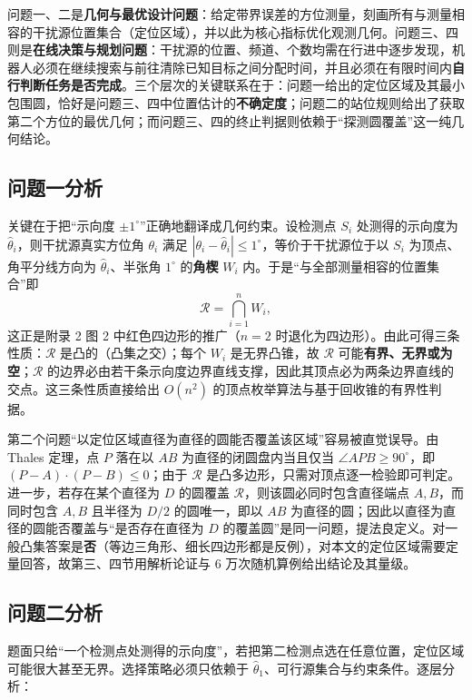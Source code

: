 \documentclass{cumcmthesis}
\begin{document}
问题一、二是\textbf{几何与最优设计问题}：给定带界误差的方位测量，刻画所有与测量相容的干扰源位置集合（定位区域），并以此为核心指标优化观测几何。问题三、四则是\textbf{在线决策与规划问题}：干扰源的位置、频道、个数均需在行进中逐步发现，机器人必须在继续搜索与前往清除已知目标之间分配时间，并且必须在有限时间内\textbf{自行判断任务是否完成}。三个层次的关键联系在于：问题一给出的定位区域及其最小包围圆，恰好是问题三、四中位置估计的\textbf{不确定度}；问题二的站位规则给出了获取第二个方位的最优几何；而问题三、四的终止判据则依赖于“探测圆覆盖”这一纯几何结论。

\subsection{问题一分析}

关键在于把“示向度 $\pm1^{\circ}$”正确地翻译成几何约束。设检测点 $S_i$ 处测得的示向度为 $\hat\theta_i$，则干扰源真实方位角 $\theta_i$ 满足 $|\theta_i-\hat\theta_i|\le 1^{\circ}$，等价于干扰源位于以 $S_i$ 为顶点、角平分线方向为 $\hat\theta_i$、半张角 $1^{\circ}$ 的\textbf{角楔} $W_i$ 内。于是“与全部测量相容的位置集合”即
\[
\mathcal{R}=\bigcap_{i=1}^{n} W_i,
\]
这正是附录 2 图 2 中红色四边形的推广（$n=2$ 时退化为四边形）。由此可得三条性质：$\mathcal{R}$ 是凸的（凸集之交）；每个 $W_i$ 是无界凸锥，故 $\mathcal{R}$ 可能\textbf{有界、无界或为空}；$\mathcal{R}$ 的边界必由若干条示向度边界直线支撑，因此其顶点必为两条边界直线的交点。这三条性质直接给出 $O(n^2)$ 的顶点枚举算法与基于回收锥的有界性判据。

第二个问题“以定位区域直径为直径的圆能否覆盖该区域”容易被直觉误导。由 Thales 定理，点 $P$ 落在以 $AB$ 为直径的闭圆盘内当且仅当 $\angle APB\ge90^{\circ}$，即 $(P-A)\cdot(P-B)\le0$；由于 $\mathcal{R}$ 是凸多边形，只需对顶点逐一检验即可判定。进一步，若存在某个直径为 $D$ 的圆覆盖 $\mathcal{R}$，则该圆必同时包含直径端点 $A,B$，而同时包含 $A,B$ 且半径为 $D/2$ 的圆唯一，即以 $AB$ 为直径的圆；因此以直径为直径的圆能否覆盖与“是否存在直径为 $D$ 的覆盖圆”是同一问题，提法良定义。对一般凸集答案是\textbf{否}（等边三角形、细长四边形都是反例），对本文的定位区域需要定量回答，故第三、四节用解析论证与 6 万次随机算例给出结论及其量级。

\subsection{问题二分析}

题面只给“一个检测点处测得的示向度”，若把第二检测点选在任意位置，定位区域可能很大甚至无界。选择策略必须只依赖于 $\hat\theta_1$、可行源集合与约束条件。逐层分析：
\end{document}
